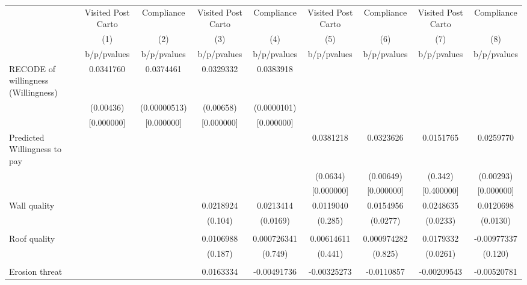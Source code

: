 {
\def\sym#1{\ifmmode^{#1}\else\(^{#1}\)\fi}
\begin{tabular}{l*{8}{c}}
\toprule
                &\multicolumn{1}{c}{Visited Post Carto}&\multicolumn{1}{c}{Compliance}&\multicolumn{1}{c}{Visited Post Carto}&\multicolumn{1}{c}{Compliance}&\multicolumn{1}{c}{Visited Post Carto}&\multicolumn{1}{c}{Compliance}&\multicolumn{1}{c}{Visited Post Carto}&\multicolumn{1}{c}{Compliance}\\
                &\multicolumn{1}{c}{(1)}&\multicolumn{1}{c}{(2)}&\multicolumn{1}{c}{(3)}&\multicolumn{1}{c}{(4)}&\multicolumn{1}{c}{(5)}&\multicolumn{1}{c}{(6)}&\multicolumn{1}{c}{(7)}&\multicolumn{1}{c}{(8)}\\
                &b/p/pvalues&b/p/pvalues&b/p/pvalues&b/p/pvalues&b/p/pvalues&b/p/pvalues&b/p/pvalues&b/p/pvalues\\
\midrule
RECODE of willingness (Willingness)&0.0341760&0.0374461&0.0329332&0.0383918&         &         &         &         \\
                &(0.00436)&(0.00000513)&(0.00658)&(0.0000101)&         &         &         &         \\
                &[0.000000]&[0.000000]&[0.000000]&[0.000000]&         &         &         &         \\
Predicted Willingness to pay&         &         &         &         &0.0381218&0.0323626&0.0151765&0.0259770\\
                &         &         &         &         & (0.0634)&(0.00649)&  (0.342)&(0.00293)\\
                &         &         &         &         &[0.000000]&[0.000000]&[0.400000]&[0.000000]\\
Wall quality    &         &         &0.0218924&0.0213414&0.0119040&0.0154956&0.0248635&0.0120698\\
                &         &         &  (0.104)& (0.0169)&  (0.285)& (0.0277)& (0.0233)& (0.0130)\\
                &         &         &         &         &         &         &         &         \\
Roof quality    &         &         &0.0106988&0.000726341&0.00614611&0.000974282&0.0179332&-0.00977337\\
                &         &         &  (0.187)&  (0.749)&  (0.441)&  (0.825)& (0.0261)&  (0.120)\\
                &         &         &         &         &         &         &         &         \\
Erosion threat  &         &         &0.0163334&-0.00491736&-0.00325273&-0.0110857&-0.00209543&-0.00520781\\

\end{tabular}}
